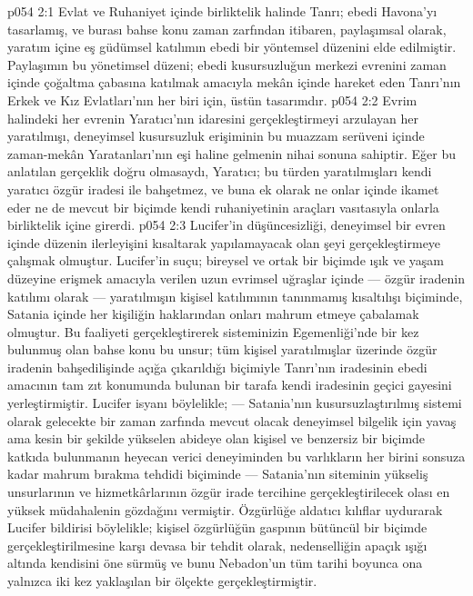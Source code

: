 \vs p054 2:1 Evlat ve Ruhaniyet içinde birliktelik halinde Tanrı; ebedi Havona’yı tasarlamış, ve burası bahse konu zaman zarfından itibaren, paylaşımsal olarak, yaratım içine eş güdümsel katılımın ebedi bir yöntemsel düzenini elde edilmiştir. Paylaşımın bu yönetimsel düzeni; ebedi kusursuzluğun merkezi evrenini zaman içinde çoğaltma çabasına katılmak amacıyla mekân içinde hareket eden Tanrı’nın Erkek ve Kız Evlatları’nın her biri için, üstün tasarımdır.
\vs p054 2:2 Evrim halindeki her evrenin Yaratıcı’nın idaresini gerçekleştirmeyi arzulayan her yaratılmışı, deneyimsel kusursuzluk erişiminin bu muazzam serüveni içinde zaman\hyp{}mekân Yaratanları’nın eşi haline gelmenin nihai sonuna sahiptir. Eğer bu anlatılan gerçeklik doğru olmasaydı, Yaratıcı; bu türden yaratılmışları kendi yaratıcı özgür iradesi ile bahşetmez, ve buna ek olarak ne onlar içinde ikamet eder ne de mevcut bir biçimde kendi ruhaniyetinin araçları vasıtasıyla onlarla birliktelik içine girerdi.
\vs p054 2:3 Lucifer’in düşüncesizliği, deneyimsel bir evren içinde düzenin ilerleyişini kısaltarak yapılamayacak olan şeyi gerçekleştirmeye çalışmak olmuştur. Lucifer’in suçu; bireysel ve ortak bir biçimde ışık ve yaşam düzeyine erişmek amacıyla verilen uzun evrimsel uğraşlar içinde --- özgür iradenin katılımı olarak --- yaratılmışın kişisel katılımının tanınmamış kısaltılışı biçiminde, Satania içinde her kişiliğin haklarından onları mahrum etmeye çabalamak olmuştur. Bu faaliyeti gerçekleştirerek sisteminizin Egemenliği’nde bir kez bulunmuş olan bahse konu bu unsur; tüm kişisel yaratılmışlar üzerinde özgür iradenin bahşedilişinde açığa çıkarıldığı biçimiyle Tanrı’nın iradesinin ebedi amacının tam zıt konumunda bulunan bir tarafa kendi iradesinin geçici gayesini yerleştirmiştir. Lucifer isyanı böylelikle; --- Satania’nın kusursuzlaştırılmış sistemi olarak gelecekte bir zaman zarfında mevcut olacak deneyimsel bilgelik için yavaş ama kesin bir şekilde yükselen abideye olan kişisel ve benzersiz bir biçimde katkıda bulunmanın heyecan verici deneyiminden bu varlıkların her birini sonsuza kadar mahrum bırakma tehdidi biçiminde --- Satania’nın siteminin yükseliş unsurlarının ve hizmetkârlarının özgür irade tercihine gerçekleştirilecek olası en yüksek müdahalenin gözdağını vermiştir. Özgürlüğe aldatıcı kılıflar uydurarak Lucifer bildirisi böylelikle; kişisel özgürlüğün gaspının bütüncül bir biçimde gerçekleştirilmesine karşı devasa bir tehdit olarak, nedenselliğin apaçık ışığı altında kendisini öne sürmüş ve bunu Nebadon’un tüm tarihi boyunca ona yalnızca iki kez yaklaşılan bir ölçekte gerçekleştirmiştir.
